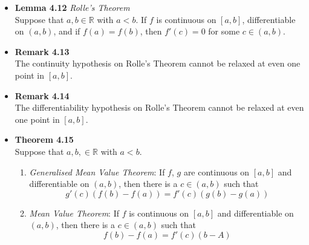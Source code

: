 \documentclass[11pt,a4paper]{article}
\begin{document}
\begin{itemize}

    \item \textbf{Lemma 4.12} \emph{Rolle's Theorem} \\
        Suppose that $a, b \in \mathbb{R}$ with $a < b$.
        If $f$ is continuous on $[a, b]$, differentiable on $(a, b)$, and if $f(a) = f(b)$,
        then $f'(c) = 0$ for some $c \in (a, b)$.

    \item \textbf{Remark 4.13} \\
        The continuity hypothesis on Rolle's Theorem cannot be relaxed at even one point
        in $[a, b]$.

    \item \textbf{Remark 4.14} \\
        The differentiability hypothesis on Rolle's Theorem cannot be relaxed at even one point
        in $[a, b]$.

    \item \textbf{Theorem 4.15} \\
        Suppose that $a, b, \in \mathbb{R}$ with $a<b$.
        \begin{enumerate}
            \item \emph{Generalised Mean Value Theorem}:
                If $f$, $g$ are continuous on $[a, b]$ and differentiable on $(a, b)$,
                then there is a $c \in (a, b)$ such that
                \[
                    g'(c) (f(b) - f(a)) = f'(c) (g(b) - g(a))
                \]

            \item \emph{Mean Value Theorem}:
                If $f$ is continuous on $[a, b]$ and differentiable on $(a, b)$, then there
                is a $c \in (a, b)$ such that
                \[
                    f(b) - f(a) = f'(c)(b-A)
                \]

        \end{enumerate}


\end{itemize}
\end{document}
